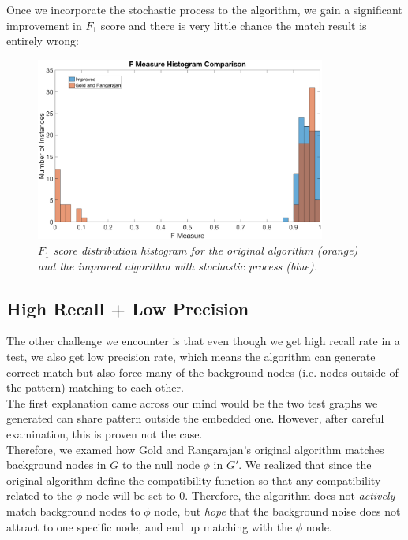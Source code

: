 Once we incorporate the stochastic process to the algorithm, we gain a significant improvement in $F_1$ score and there is very little chance the match result is entirely wrong:

\begin{figure}[h]
	\centering
	\captionsetup{justification=centering}
	\includegraphics[width=0.85\textwidth]{figs/s_improved.png}
	\caption[Caption for LOF]{\emph{$F_1$ score distribution histogram for the original algorithm (orange) and the improved algorithm with stochastic process (blue).}}
	\label{fig:stochastic}
\end{figure}

\subsection{High Recall + Low Precision}
\label{ssec:nullnode}

The other challenge we encounter is that even though we get high recall rate in a test, we also get low precision rate, which means the algorithm can generate correct match but also force many of the background nodes (i.e. nodes outside of the pattern) matching  to each other.\\

The first explanation came across our mind would be the two test graphs we generated can share pattern outside the embedded one. However, after careful examination, this is proven not the case.\\

Therefore, we examed how Gold and Rangarajan's original algorithm matches background nodes in $G$ to the null node $\phi$ in $G'$. We realized that since the original algorithm define the compatibility function so that any compatibility related to the $\phi$ node will be set to 0. Therefore, the algorithm does not \emph{actively} match background nodes to  $\phi$ node, but \emph{hope} that the background noise does not attract to one specific node, and end up matching with the $\phi$ node.\\

